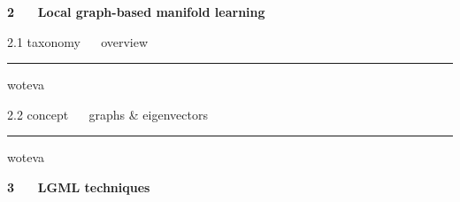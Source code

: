 \documentclass[11pt,compress,t,notes=noshow, xcolor=table]{beamer}
\newcommand{\highlight}[1]{\textcolor{highlightcol}{\textbf{#1}}}
\begin{document}

\begin{frame}{}

\LARGE
\hspace{0pt}
\vfill
\textbf{\highlight{2 ~~ Local graph-based manifold learning}}
\vfill
\hspace{0pt}

\end{frame}


\LARGE
\begin{frame}{\textcolor{gray!90}{2.1 taxonomy} ~~ overview}
\normalsize
\vspace{-0.5cm}
\noindent \textcolor{gray!90}{\rule{\textwidth}{1pt}}


\medskip

woteva

\end{frame}


\LARGE
\begin{frame}{\textcolor{gray!90}{2.2 concept} ~~ graphs \& eigenvectors}
\normalsize
\vspace{-0.5cm}
\noindent \textcolor{gray!90}{\rule{\textwidth}{1pt}}


\medskip

woteva

\end{frame}


\begin{frame}{}

\LARGE
\hspace{0pt}
\vfill
\textbf{\highlight{3 ~~ LGML techniques}}
\vfill
\hspace{0pt}

\end{frame}

\end{document}

